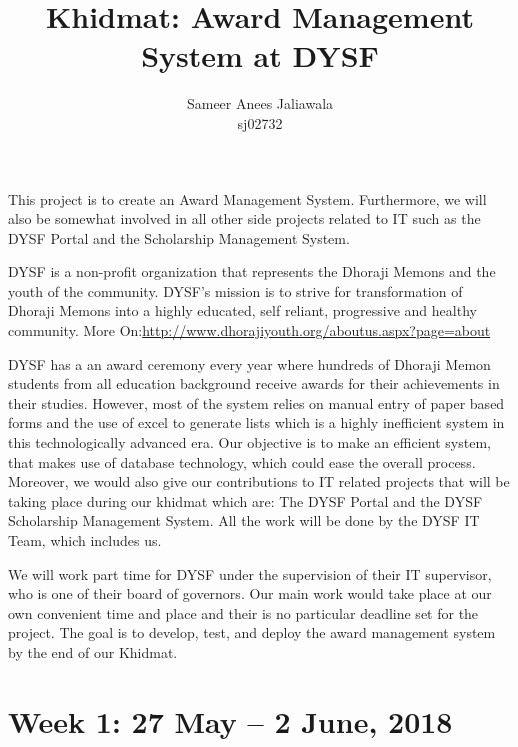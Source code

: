 \documentclass{article}
\title {Khidmat: Award Management System at DYSF}
\author{
  Sameer Anees Jaliawala\\ sj02732 
}
\date{}
\begin{document}
\maketitle


This project is to create an Award Management System. Furthermore, we will also be somewhat involved in all other side projects related to IT such as the DYSF Portal and the Scholarship Management System.  

DYSF is a non-profit organization that represents the Dhoraji Memons and the youth of the community. DYSF's mission is to strive for transformation of Dhoraji Memons into a highly educated, self reliant, progressive and healthy community. More On:\newline \href{http://www.dhorajiyouth.org/aboutus.aspx?page=about}{http://www.dhorajiyouth.org/aboutus.aspx?page=about}

DYSF has a an award ceremony every year where hundreds of Dhoraji Memon students from all education background receive awards for their achievements in their studies. However, most of the system relies on manual entry of paper based forms and the use of excel to generate lists which is a highly inefficient system in this technologically advanced era. Our objective is to make an efficient system, that makes use of database technology, which could ease the overall process. Moreover, we would also give our contributions to IT related projects that will be taking place during our khidmat which are: The DYSF Portal and the DYSF Scholarship Management System. All the work will be done by the DYSF IT Team, which includes us.

We will work part time for DYSF under the supervision of their IT supervisor, who is one of their board of governors. Our main work would take place at our own convenient time and place and their is no particular deadline set for the project. The goal is to develop, test, and deploy the award management system by the end of our Khidmat.

\newpage %
\section*{Week 1: 27 May -- 2 June, 2018}
\end{document}

